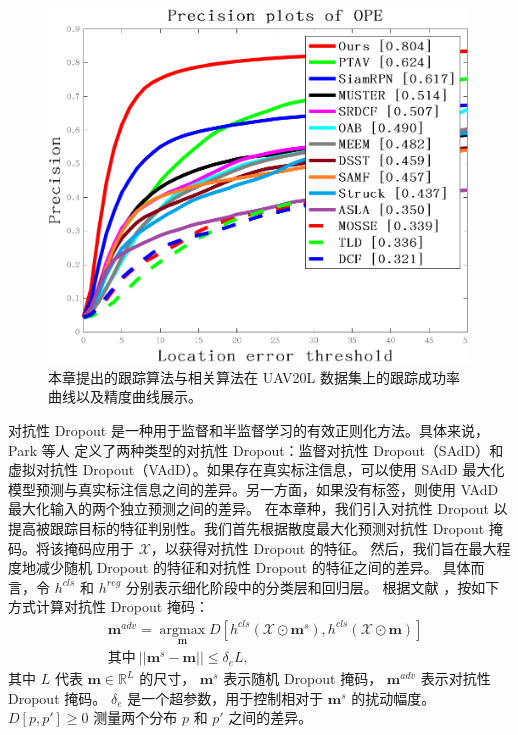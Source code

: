 \begin{figure}[t]
\begin{minipage}{0.48\textwidth}
  \centerline{\includegraphics[width=0.99\textwidth]{Img/end/quality_plot_error_OPE_threshold.png}}
\end{minipage}
\caption{本章提出的跟踪算法与相关算法在 UAV20L \cite{mueller2016benchmark} 数据集上的跟踪成功率曲线以及精度曲线展示。}
\end{figure}
对抗性 Dropout 是一种用于监督和半监督学习的有效正则化方法。具体来说，Park 等人 \cite{park2018adversarial} 定义了两种类型的对抗性 Dropout：监督对抗性 Dropout（SAdD）和虚拟对抗性 Dropout（VAdD）。如果存在真实标注信息，可以使用 SAdD 最大化模型预测与真实标注信息之间的差异。另一方面，如果没有标签，则使用 VAdD 最大化输入的两个独立预测之间的差异。%
在本章种，我们引入对抗性 Dropout 以提高被跟踪目标的特征判别性。我们首先根据散度最大化预测对抗性 Dropout 掩码。将该掩码应用于 $\mathcal{X}$，以获得对抗性 Dropout 的特征。
然后，我们旨在最大程度地减少随机 Dropout 的特征和对抗性 Dropout 的特征之间的差异。
具体而言，令 $h^{cls}$ 和 $h^{reg}$ 分别表示细化阶段中的分类层和回归层。
根据文献 \cite{lee2019drop}，按如下方式计算对抗性 Dropout 掩码：
\begin{equation}
\begin{split}
    & \mathbf{m}^{adv} = \mathop{\arg\max}\limits_{\mathbf{m}}D[h^{cls}(\mathcal{X} \odot \mathbf{m}^s), h^{cls}(\mathcal{X} \odot \mathbf{m})] \\
    & 其中~||\mathbf{m}^s - \mathbf{m}|| \leq \delta_e L,
\end{split}
\end{equation}
其中 $L$ 代表 $\mathbf{m} \in \mathbb R^L$ 的尺寸，
$\mathbf{m}^s$ 表示随机 Dropout 掩码， $\mathbf{m}^{adv}$ 表示对抗性 Dropout 掩码。
$\delta_{e}$ 是一个超参数，用于控制相对于 $\mathbf{m}^{s}$ \cite{lee2019drop} 的扰动幅度。
$D[p, p'] \geq 0$ 测量两个分布 $p$ 和 $p'$ 之间的差异。

